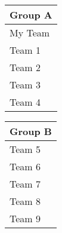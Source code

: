 \begin{minipage}{0.25\textwidth}
\centering
\LARGE{
\begin{tabular}{|l|}
\hline
\textbf{Group A}\\ 
\hline
My Team\\ 
Team 1\\ 
Team 2\\ 
Team 3\\ 
Team 4\\ 
\hline
\end{tabular}
}
\end{minipage}
\begin{minipage}{0.25\textwidth}
\centering
\LARGE{
\begin{tabular}{|l|}
\hline
\textbf{Group B}\\ 
\hline
Team 5\\ 
Team 6\\ 
Team 7\\ 
Team 8\\ 
Team 9\\ 
\hline
\end{tabular}
}
\end{minipage}
